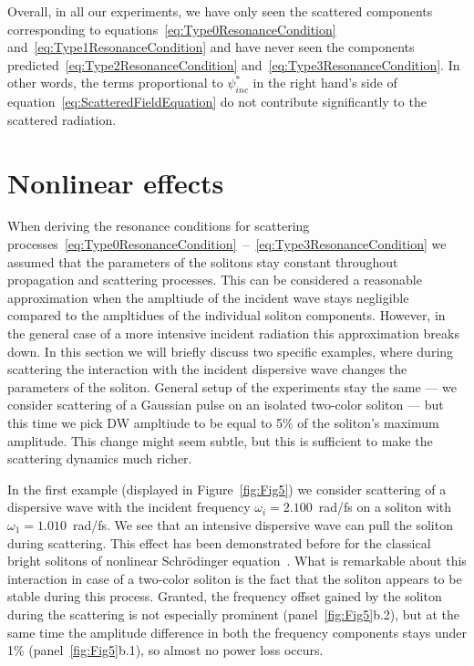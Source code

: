\documentclass[aps, prl, twocolumn, superscriptaddress, final]{revtex4}
\begin{document}
Overall, in all our experiments, we have only seen the scattered components corresponding to equations~\eqref{eq:Type0ResonanceCondition} and~\eqref{eq:Type1ResonanceCondition} and have never seen the components predicted~\eqref{eq:Type2ResonanceCondition} and~\eqref{eq:Type3ResonanceCondition}. In other words, the terms proportional to $\psi_{inc}^{*}$ in the right hand's side of equation~\eqref{eq:ScatteredFieldEquation} do not contribute significantly to the scattered radiation.

\section{Nonlinear effects}

When deriving the resonance conditions for scattering processes~\eqref{eq:Type0ResonanceCondition}~--~\eqref{eq:Type3ResonanceCondition} we assumed that the parameters of the solitons stay constant throughout propagation and scattering processes. This can be considered a reasonable approximation when the ampltiude of the incident wave stays negligible compared to the ampltidues of the individual soliton components. However, in the general case of a more intensive incident radiation this approximation breaks down. In this section we will briefly discuss two specific examples, where during scattering the interaction with the incident dispersive wave changes the parameters of the soliton. General setup of the experiments stay the same --- we consider scattering of a Gaussian pulse on an isolated two-color soliton --- but this time we pick DW ampltiude to be equal to 5\% of the soliton's maximum amplitude. This change might seem subtle, but this is sufficient to make the scattering dynamics much richer.

In the first example (displayed in Figure~\ref{fig:Fig5}) we consider scattering of a dispersive wave with the incident frequency $\omega_{i} = 2.100$~rad/fs on a soliton with $\omega_{1} = 1.010$~rad/fs. We see that an intensive dispersive wave can pull the soliton during scattering. This effect has been demonstrated before for the classical bright solitons of nonlinear Schr\"odinger equation~\cite{demircan2011controlling, tartara2015soliton}. What is remarkable about this interaction in case of a two-color soliton is the fact that the soliton appears to be stable during this process. Granted, the frequency offset gained by the soliton during the scattering is not especially prominent (panel~\ref{fig:Fig5}b.2), but at the same time the amplitude difference in both the frequency components stays under 1\% (panel~\ref{fig:Fig5}b.1), so almost no power loss occurs.
\end{document}
